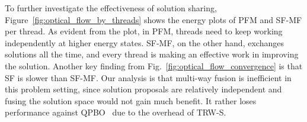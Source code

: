 % 
%
To further investigate the effectiveness of solution sharing,
Figure~\ref{fig:optical_flow_by_threads} shows the energy plots of PFM
and SF-MF per thread. As evident from the plot, in PFM, threads need to
keep working independently at higher energy states.
SF-MF, on the other hand, exchanges solutions all the time, and every
thread is making an effective work in improving the solution.
Another key finding from Fig.~\ref{fig:optical_flow_convergence} is that
SF is slower than SF-MF. Our analysis is that multi-way fusion is
inefficient in this problem setting, since solution proposals are
relatively independent and fusing the solution space would not gain much
benefit. It rather loses performance against QPBO~\cite{QPBO} due to the
overhead of TRW-S.

